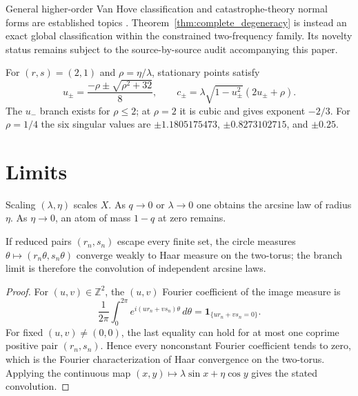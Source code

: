 \documentclass[11pt]{amsart}
\numberwithin{equation}{section}\setcounter{tocdepth}{3}\setcounter{secnumdepth}{3}
\begin{document}
General higher-order Van Hove classification and catastrophe-theory normal forms are
established topics \cite{ClassenBetouras2025}.  Theorem~\ref{thm:complete_degeneracy}
is instead an exact global classification within the constrained two-frequency family.
Its novelty status remains subject to the source-by-source audit accompanying this paper.

For $(r,s)=(2,1)$ and $\rho=\eta/\lambda$, stationary points satisfy
\begin{equation}u_\pm=\frac{-\rho\pm\sqrt{\rho^2+32}}8,\qquad
c_\pm=\lambda\sqrt{1-u_\pm^2}(2u_\pm+\rho).\label{eq:initial_critical}\end{equation}
The $u_-$ branch exists for $\rho\le2$; at $\rho=2$ it is cubic and gives exponent
$-2/3$.  For $\rho=1/4$ the six singular values are
$\pm1.1805175473$, $\pm0.8273102715$, and $\pm0.25$.
\section{Limits}\label{sec:limits}
Scaling $(\lambda,\eta)$ scales $X$.  As $q\to0$ or $\lambda\to0$ one obtains the
arcsine law of radius $\eta$.  As $\eta\to0$, an atom of mass $1-q$ at zero remains.
\begin{proposition}\label{prop:frequency_limit}
If reduced pairs $(r_n,s_n)$ escape every finite set, the circle measures
$\theta\mapsto(r_n\theta,s_n\theta)$ converge weakly to Haar measure on the two-torus;
the branch limit is therefore the convolution of independent arcsine laws.
\end{proposition}
\begin{proof}
For $(u,v)\in\mathbb Z^2$, the $(u,v)$ Fourier coefficient of the image measure is
\begin{equation}
 \frac{1}{2\pi}\int_0^{2\pi}
 e^{i(ur_n+vs_n)\theta}\,d\theta
 =\mathbf 1_{\{ur_n+vs_n=0\}}.
 \label{eq:subtorus_fourier_coefficient}
\end{equation}
For fixed $(u,v)\ne(0,0)$, the last equality can hold for at most one coprime positive
pair $(r_n,s_n)$.  Hence every nonconstant Fourier coefficient tends to zero, which is
the Fourier characterization of Haar convergence on the two-torus.  Applying the
continuous map $(x,y)\mapsto\lambda\sin x+\eta\cos y$ gives the stated convolution.
\end{proof}
\end{document}
